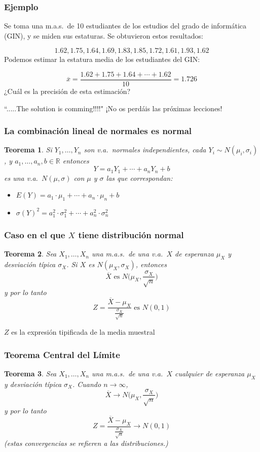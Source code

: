 \documentclass[12pt,t]{beamer}\usepackage[]{graphicx}\usepackage[]{color}
\renewcommand{\emph}[1]{{\color{red}#1}}
\newcommand{\RR}{\mathbb{R}}
\theoremstyle{plain}
\newtheorem{teorema}{Teorema}
\theoremstyle{definition}
\begin{document}
\begin{frame}
\frametitle{Ejemplo}
Se toma  una m.a.s.\ de 10 estudiantes de los estudios del grado de informática (GIN), y se miden sus estaturas. Se obtuvieron estos resultados:

$$
1.62,1.75,1.64,1.69,1.83,1.85,1.72,1.61,1.93, 1.62
$$
Podemos  estimar la estatura media de los estudiantes del GIN:

$$
\overline{x}=\frac{1.62+1.75+1.64+\cdots+1.62}{10}=1.726
$$
¿Cuál es la precisión de esta estimación? 
\break 

``\emph{.....The solution is comming!!!!}" ¡No os perdáis las próximas lecciones!

\end{frame}


\begin{frame}
\frametitle{La combinación lineal de normales es normal}
\begin{teorema}
Si $Y_1,\ldots,Y_n$ son v.a.\ normales independientes, cada $Y_i\sim N(\mu_i,\sigma_i)$, y $a_1,\ldots,a_n,b\in \RR$ entonces
$$
Y=a_1Y_1+\cdots+a_nY_n+b
$$
es una v.a.\ $N(\mu,\sigma)$ con $\mu$ y $\sigma$ las que correspondan:
\begin{itemize}
\item $E(Y)=a_1\cdot\mu_1+\cdots+a_n\cdot\mu_n+b$
\medskip

\item $\sigma(Y)^2=a_1^2\cdot\sigma_1^2+\cdots+a_n^2\cdot\sigma_n^2$
\end{itemize}
\end{teorema}
\end{frame}




\begin{frame}
\frametitle{Caso  en el que $X$  tiene distribución normal}
\begin{teorema}
Sea $X_1,\ldots, X_n$ una m.a.s.\ de una v.a.\ $X$ de esperanza $\mu_X$ y desviación típica $\sigma_X$.
Si $X$ es $N(\mu_X,\sigma_X)$, entonces
$$
\overline{X}\mbox{ es }N\Big(\mu_X,\frac{\sigma_X}{\sqrt{n}}\Big)
$$
y por lo tanto
$$
Z=\frac{\overline{X}-\mu_X}{\frac{\sigma_X}{\sqrt{n}}}\mbox{ es }N(0,1)
$$
\end{teorema}

$Z$ es la \emph{expresión tipificada} de la media muestral

\end{frame}




\begin{frame}
\frametitle{Teorema Central del Límite}
\begin{teorema}
Sea $X_1,\ldots, X_n$ una m.a.s.\ de una v.a.\ $X$ \emph{cualquier} de esperanza $\mu_X$ y desviación típica $\sigma_X$. Cuando $n\to \infty$, 
$$
\overline{X}\to N\Big(\mu_X,\frac{\sigma_X}{\sqrt{n}}\Big)
$$
y por lo tanto
$$
Z=\frac{\overline{X}-\mu_X}{\frac{\sigma_X}{\sqrt{n}}}\to N(0,1)
$$
(estas convergencias se refieren a las distribuciones.)
\end{teorema}
\end{frame}
\end{document}
